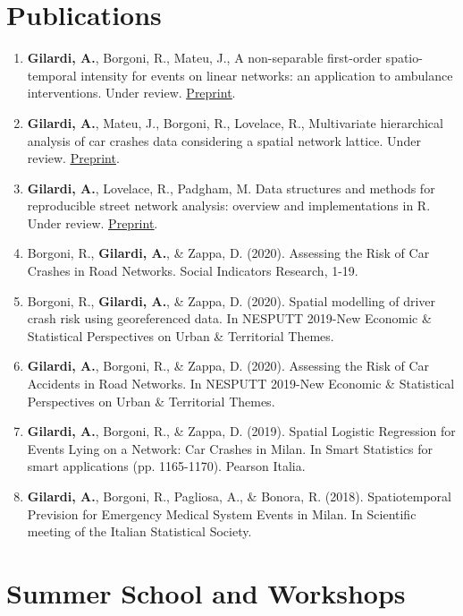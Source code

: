 \documentclass[11pt,a4paper,sans]{moderncv}
\begin{document}
  \section{Publications}
  \begin{enumerate}
  \item \textbf{Gilardi, A.}, Borgoni, R., Mateu, J., A non-separable first-order spatio-temporal intensity for events on linear networks: an application to ambulance interventions. Under review. \underline{\href{https://arxiv.org/abs/2106.00457}{Preprint}}.  
  \item \textbf{Gilardi, A.}, Mateu, J., Borgoni, R., Lovelace, R., Multivariate hierarchical analysis of car crashes data considering a spatial network lattice. Under review. \underline{\href{https://arxiv.org/abs/2011.12595}{Preprint}}.  
  \item \textbf{Gilardi, A.}, Lovelace, R., Padgham, M. Data structures and methods for reproducible street network analysis: overview and implementations in R. Under review. \underline{\href{https://osf.io/78yub}{Preprint}}.
  \item Borgoni, R., \textbf{Gilardi, A.}, \& Zappa, D. (2020). Assessing the Risk of Car Crashes in Road Networks. Social Indicators Research, 1-19.
  \item Borgoni, R., \textbf{Gilardi, A.}, \& Zappa, D. (2020). Spatial modelling of driver crash risk using georeferenced data. In NESPUTT 2019-New Economic \& Statistical Perspectives on Urban \& Territorial Themes.
  \item \textbf{Gilardi, A.}, Borgoni, R., \& Zappa, D. (2020). Assessing the Risk of Car Accidents in Road Networks. In NESPUTT 2019-New Economic \& Statistical Perspectives on Urban \& Territorial Themes.
  \item \textbf{Gilardi, A.}, Borgoni, R., \& Zappa, D. (2019). Spatial Logistic Regression for Events Lying on a Network: Car Crashes in Milan. In Smart Statistics for smart applications (pp. 1165-1170). Pearson Italia.
  \item \textbf{Gilardi, A.}, Borgoni, R., Pagliosa, A., \& Bonora, R. (2018). Spatiotemporal Prevision for Emergency Medical System Events in Milan. In Scientific meeting of the Italian Statistical Society.
  \end{enumerate}

  \section{Summer School and Workshops}
  
\end{document}
